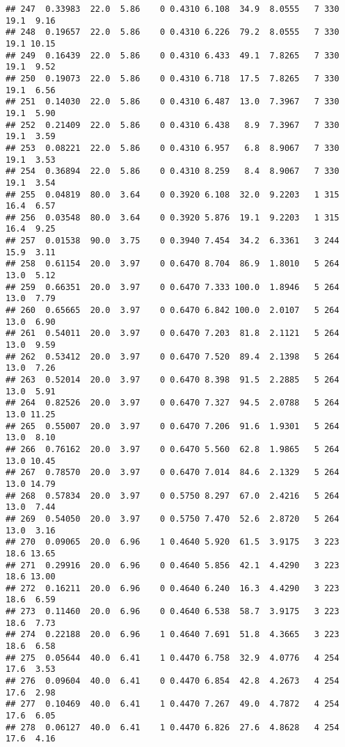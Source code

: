 \documentclass[
]{article}
\begin{document}
\begin{verbatim}
## 247  0.33983  22.0  5.86    0 0.4310 6.108  34.9  8.0555   7 330    19.1  9.16
## 248  0.19657  22.0  5.86    0 0.4310 6.226  79.2  8.0555   7 330    19.1 10.15
## 249  0.16439  22.0  5.86    0 0.4310 6.433  49.1  7.8265   7 330    19.1  9.52
## 250  0.19073  22.0  5.86    0 0.4310 6.718  17.5  7.8265   7 330    19.1  6.56
## 251  0.14030  22.0  5.86    0 0.4310 6.487  13.0  7.3967   7 330    19.1  5.90
## 252  0.21409  22.0  5.86    0 0.4310 6.438   8.9  7.3967   7 330    19.1  3.59
## 253  0.08221  22.0  5.86    0 0.4310 6.957   6.8  8.9067   7 330    19.1  3.53
## 254  0.36894  22.0  5.86    0 0.4310 8.259   8.4  8.9067   7 330    19.1  3.54
## 255  0.04819  80.0  3.64    0 0.3920 6.108  32.0  9.2203   1 315    16.4  6.57
## 256  0.03548  80.0  3.64    0 0.3920 5.876  19.1  9.2203   1 315    16.4  9.25
## 257  0.01538  90.0  3.75    0 0.3940 7.454  34.2  6.3361   3 244    15.9  3.11
## 258  0.61154  20.0  3.97    0 0.6470 8.704  86.9  1.8010   5 264    13.0  5.12
## 259  0.66351  20.0  3.97    0 0.6470 7.333 100.0  1.8946   5 264    13.0  7.79
## 260  0.65665  20.0  3.97    0 0.6470 6.842 100.0  2.0107   5 264    13.0  6.90
## 261  0.54011  20.0  3.97    0 0.6470 7.203  81.8  2.1121   5 264    13.0  9.59
## 262  0.53412  20.0  3.97    0 0.6470 7.520  89.4  2.1398   5 264    13.0  7.26
## 263  0.52014  20.0  3.97    0 0.6470 8.398  91.5  2.2885   5 264    13.0  5.91
## 264  0.82526  20.0  3.97    0 0.6470 7.327  94.5  2.0788   5 264    13.0 11.25
## 265  0.55007  20.0  3.97    0 0.6470 7.206  91.6  1.9301   5 264    13.0  8.10
## 266  0.76162  20.0  3.97    0 0.6470 5.560  62.8  1.9865   5 264    13.0 10.45
## 267  0.78570  20.0  3.97    0 0.6470 7.014  84.6  2.1329   5 264    13.0 14.79
## 268  0.57834  20.0  3.97    0 0.5750 8.297  67.0  2.4216   5 264    13.0  7.44
## 269  0.54050  20.0  3.97    0 0.5750 7.470  52.6  2.8720   5 264    13.0  3.16
## 270  0.09065  20.0  6.96    1 0.4640 5.920  61.5  3.9175   3 223    18.6 13.65
## 271  0.29916  20.0  6.96    0 0.4640 5.856  42.1  4.4290   3 223    18.6 13.00
## 272  0.16211  20.0  6.96    0 0.4640 6.240  16.3  4.4290   3 223    18.6  6.59
## 273  0.11460  20.0  6.96    0 0.4640 6.538  58.7  3.9175   3 223    18.6  7.73
## 274  0.22188  20.0  6.96    1 0.4640 7.691  51.8  4.3665   3 223    18.6  6.58
## 275  0.05644  40.0  6.41    1 0.4470 6.758  32.9  4.0776   4 254    17.6  3.53
## 276  0.09604  40.0  6.41    0 0.4470 6.854  42.8  4.2673   4 254    17.6  2.98
## 277  0.10469  40.0  6.41    1 0.4470 7.267  49.0  4.7872   4 254    17.6  6.05
## 278  0.06127  40.0  6.41    1 0.4470 6.826  27.6  4.8628   4 254    17.6  4.16

\end{verbatim}
\end{document}
